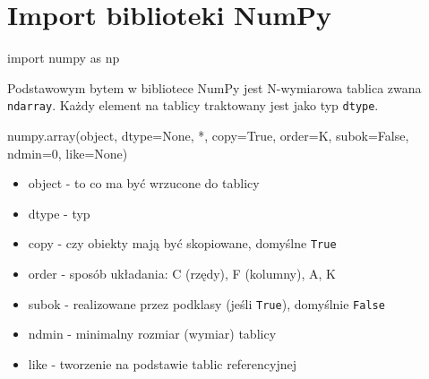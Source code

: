 \documentclass[
  polish,
  letterpaper,
  DIV=11,
  numbers=noendperiod]{scrreprt}
\newenvironment{Shaded}{\begin{snugshade}}{\end{snugshade}}
\newcommand{\BuiltInTok}[1]{\textcolor[rgb]{0.00,0.23,0.31}{#1}}
\newcommand{\DecValTok}[1]{\textcolor[rgb]{0.68,0.00,0.00}{#1}}
\newcommand{\ImportTok}[1]{\textcolor[rgb]{0.00,0.46,0.62}{#1}}
\newcommand{\NormalTok}[1]{\textcolor[rgb]{0.00,0.23,0.31}{#1}}
\newcommand{\OperatorTok}[1]{\textcolor[rgb]{0.37,0.37,0.37}{#1}}
\newcommand{\StringTok}[1]{\textcolor[rgb]{0.13,0.47,0.30}{#1}}
\newcommand{\VariableTok}[1]{\textcolor[rgb]{0.07,0.07,0.07}{#1}}
\providecommand{\tightlist}{%
  \setlength{\itemsep}{0pt}\setlength{\parskip}{0pt}}
\begin{document}
\section{Import biblioteki NumPy}\label{import-biblioteki-numpy}

\begin{Shaded}
\begin{Highlighting}[]
\ImportTok{import}\NormalTok{ numpy }\ImportTok{as}\NormalTok{ np}
\end{Highlighting}
\end{Shaded}

Podstawowym bytem w bibliotece NumPy jest N-wymiarowa tablica zwana
\texttt{ndarray}. Każdy element na tablicy traktowany jest jako typ
\texttt{dtype}.

\begin{Shaded}
\begin{Highlighting}[]
\NormalTok{numpy.array(}\BuiltInTok{object}\NormalTok{, dtype}\OperatorTok{=}\VariableTok{None}\NormalTok{, }\OperatorTok{*}\NormalTok{, copy}\OperatorTok{=}\VariableTok{True}\NormalTok{, order}\OperatorTok{=}\StringTok{\textquotesingle{}K\textquotesingle{}}\NormalTok{, subok}\OperatorTok{=}\VariableTok{False}\NormalTok{, ndmin}\OperatorTok{=}\DecValTok{0}\NormalTok{, like}\OperatorTok{=}\VariableTok{None}\NormalTok{)}
\end{Highlighting}
\end{Shaded}

\begin{itemize}
\tightlist
\item
  object - to co ma być wrzucone do tablicy
\item
  dtype - typ
\item
  copy - czy obiekty mają być skopiowane, domyślne \texttt{True}
\item
  order - sposób układania: C (rzędy), F (kolumny), A, K
\item
  subok - realizowane przez podklasy (jeśli \texttt{True}), domyślnie
  \texttt{False}
\item
  ndmin - minimalny rozmiar (wymiar) tablicy
\item
  like - tworzenie na podstawie tablic referencyjnej
\end{itemize}
\end{document}

